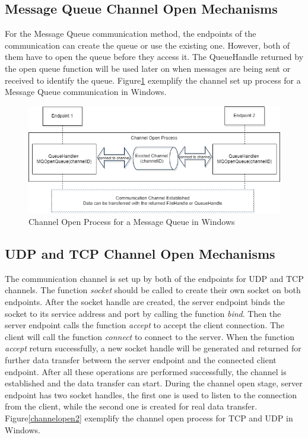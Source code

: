 \subsection{Message Queue Channel Open Mechanisms} 
For the Message Queue communication method, the endpoints of the communication can create the queue or use the existing one. However, both of them have to open the queue before they access it. The QueueHandle returned by the open queue function will be used later on when messages are being sent or received to identify the queue. Figure\ref{msmqopen} exemplify the channel set up process for a Message Queue communication in Windows.
\begin{figure}[H]
\centerline{\includegraphics[scale=0.45]{Figures/msmqchannelopen}}
 \caption{Channel Open Process for a Message Queue in Windows}
\label{msmqopen}
\end{figure}

\subsection{UDP and TCP Channel Open Mechanisms} 
The communication channel is set up by both of the endpoints for UDP and TCP channels. The function \textit{socket} should be called to create their own socket on both endpoints. After the socket handle are created, the server endpoint binds the socket to its service address and port by calling the function \textit{bind}. Then the server endpoint calls the function  \textit{accept} to accept the client connection. The client will call the function \textit{connect} to connect to the server. When the function \textit{accept} return successfully, a new socket handle will be generated and returned for further data transfer between the server endpoint and  the connected client endpoint. After all these operations are performed successfully, the channel is established and the data transfer can start. During the channel open stage, server endpoint has two socket handles, the first one is used to listen to the connection from the client, while the second one is created for real data transfer. Figure\ref{channelopen2} exemplify the channel open process for TCP and UDP  in Windows.
    
